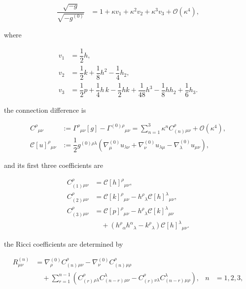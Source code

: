 \begin{align}
\dfrac{\sqrt{-g}}{\sqrt{-g^{(0)}}} & =1+\kappa v_{1}+\kappa ^2v_{2}+\kappa ^3v_{3}+\mathcal{O}(\kappa ^4),
\end{align}

where

\[\begin{aligned}
v_{1} & =\dfrac{1}{2}h, \\
v_{2} & =\dfrac{1}{2}k+\dfrac{1}{8}h^{2}-\dfrac{1}{4}h_{2}, \\
v_{3} & =\dfrac{1}{2}p+\dfrac{1}{4}h\,k-\dfrac{1}{2}hk+\dfrac{1}{48}h^{3}-\dfrac{1}{8}hh_{2}+\dfrac{1}{6}h_{3}.
\end{aligned}\]

the connection difference is

\begin{align}
C^{\rho}{}_{\mu \nu} & :=\Gamma ^{\rho}{}_{\mu \nu}[g]-\Gamma ^{(0)\rho}{}_{\mu \nu}=\sum _{n=1}^{3}\kappa ^nC_{(n)}^{\rho}{}_{\mu \nu}+\mathcal{O}(\kappa ^4), \\
\mathscr{C}[u]^{\rho}{}_{\mu \nu} & :=\dfrac{1}{2}g^{(0)\rho \lambda}\left(\nabla ^{(0)}_{\mu}u_{\lambda \nu}+\nabla ^{(0)}_{\nu}u_{\lambda \mu}-\nabla ^{(0)}_{\lambda}u_{\mu \nu}\right),
\end{align}

and its first three coefficients are

\[\begin{aligned}
C_{(1)}^{\rho}{}_{\mu \nu} & =\mathscr{C}[h]^{\rho}{}_{\mu \nu}, \\
C_{(2)}^{\rho}{}_{\mu \nu} & =\mathscr{C}[k]^{\rho}{}_{\mu \nu}-h^{\rho}{}_{\lambda}\mathscr{C}[h]^{\lambda}{}_{\mu \nu}, \\
C_{(3)}^{\rho}{}_{\mu \nu} & =\mathscr{C}[p]^{\rho}{}_{\mu \nu}-h^{\rho}{}_{\lambda}\mathscr{C}[k]^{\lambda}{}_{\mu \nu} \\
&\quad+\left(h^{\rho}{}_{\alpha}h^{\alpha}{}_{\lambda}-k^{\rho}{}_{\lambda}\right)\mathscr{C}[h]^{\lambda}{}_{\mu \nu}.
\end{aligned}\]

the Ricci coefficients are determined by

\begin{align}
R_{\mu \nu}^{(n)} & =\nabla ^{(0)}_{\rho}C_{(n)}^{\rho}{}_{\mu \nu}-\nabla ^{(0)}_{\nu}C_{(n)}^{\rho}{}_{\mu \rho} \\
&\quad+\sum _{r=1}^{n-1}\left(C_{(r)}^{\rho}{}_{\rho \lambda}C_{(n-r)}^{\lambda}{}_{\mu \nu}-C_{(r)}^{\rho}{}_{\nu \lambda}C_{(n-r)}^{\lambda}{}_{\mu \rho}\right), & n&=1,2,3,
\end{align}

